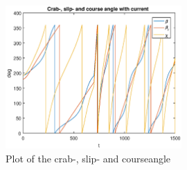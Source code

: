 \begin{figure}[!ht]
	\centering
	\includegraphics[width=0.6\textwidth]{figures/2_6_crab_slip_course.eps}
	\caption{Plot of the crab-, slip- and courseangle}
	\label{fig:2_6_crab}
\end{figure}

